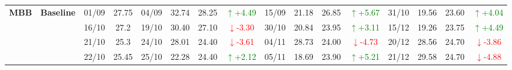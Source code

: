 \documentclass{ieeeaccess}
\begin{document}
{\begin{longtable}{llcc|cccc|cccc|cccc}
\multirow{4}{*}{\textbf{MBB}}
& \textbf{Baseline}
& 01/09 & 27.75 & 04/09 & 32.74 & 28.25 & \textcolor{green}{\(\uparrow\)+4.49} & 15/09 & 21.18 & 26.85 & \textcolor{green}{\(\uparrow\)+5.67} & 31/10 & 19.56 & 23.60 & \textcolor{green}{\(\uparrow\)+4.04} \\
& & 16/10 & 27.2 & 19/10 & 30.40 & 27.10 & \textcolor{red}{\(\downarrow\)-3.30} & 30/10 & 20.84 & 23.95 & \textcolor{green}{\(\uparrow\)+3.11} & 15/12 & 19.26 & 23.75 & \textcolor{green}{\(\uparrow\)+4.49} \\
& & 21/10 & 25.3 & 24/10 & 28.01 & 24.40 & \textcolor{red}{\(\downarrow\)-3.61} & 04/11 & 28.73 & 24.00 & \textcolor{red}{\(\downarrow\)-4.73} & 20/12 & 28.56 & 24.70 & \textcolor{red}{\(\downarrow\)-3.86} \\
& & 22/10 & 25.45 & 25/10 & 22.28 & 24.40 & \textcolor{green}{\(\uparrow\)+2.12} & 05/11 & 18.69 & 23.90 & \textcolor{green}{\(\uparrow\)+5.21} & 21/12 & 29.58 & 24.70 & \textcolor{red}{\(\downarrow\)-4.88} \\
\midrule

\end{longtable}
}


\EOD
\end{document}

